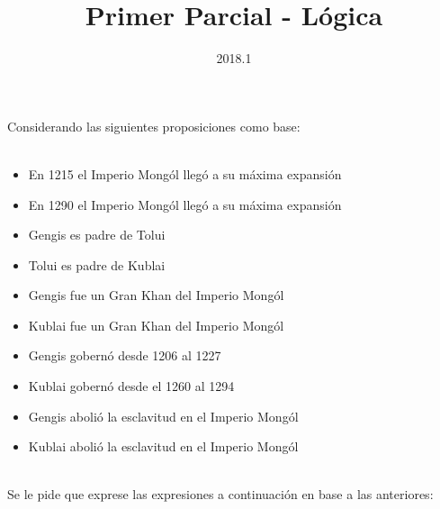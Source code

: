 \documentclass[10pt, addpoints]{../../../common/epyl_exam_template}
\title{Primer Parcial - Lógica}
\date{2018.1}
\begin{document}
\makeexamheader
\makeexamtitle
\makeexamextradata

\begin{questions}
  \question
  Considerando las siguientes proposiciones como base:\\
  ~\\
    \begin{itemize}
      \item En 1215 el Imperio Mongól llegó a su máxima expansión
      \item En 1290 el Imperio Mongól llegó a su máxima expansión
      \item Gengis es padre de Tolui
      \item Tolui es padre de Kublai
      \item Gengis fue un Gran Khan del Imperio Mongól
      \item Kublai fue un Gran Khan del Imperio Mongól
      \item Gengis gobernó desde 1206 al 1227
      \item Kublai gobernó desde el 1260 al 1294
      \item Gengis abolió la esclavitud en el Imperio Mongól
      \item Kublai abolió la esclavitud en el Imperio Mongól
    \end{itemize}
  ~\\
  Se le pide que exprese las expresiones a continuación en base a las anteriores:
\end{questions}
\end{document}
